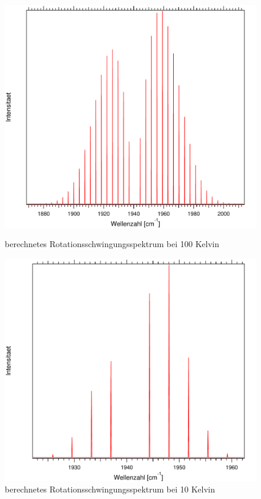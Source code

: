 \begin{figure}[H]
	
	\begin{minipage}{0.5\textwidth}
	\includegraphics[width=\textwidth]{Bilder/100CO.pdf}
	\caption{berechnetes Rotationsschwingungsspektrum bei 100 Kelvin}
	\label{Rot:100CO}
	\end{minipage}
\begin{minipage}{0.5\textwidth}
	\includegraphics[width=\textwidth]{Bilder/10CO.pdf}
	\caption{berechnetes Rotationsschwingungsspektrum bei 10 Kelvin}
	\label{Rot:10CO}
	\end{minipage}	
	
		
	
\end{figure}

